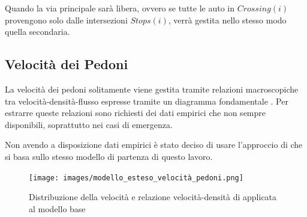 Quando la via principale sarà libera, ovvero se tutte le auto in $\textit{Crossing}(i)$ provengono solo dalle intersezioni $\textit{Stops}(i)$, verrà gestita nello stesso modo quella secondaria.

\subsection{Velocità dei Pedoni}
La velocità dei pedoni solitamente viene gestita tramite relazioni macroscopiche tra velocità-densità-flusso
espresse tramite un diagramma fondamentale \parencite{nikolic2016probabilistic}.
Per estrarre queste relazioni sono richiesti dei dati empirici che non sempre disponibili, soprattutto nei casi di emergenza.

Non avendo a disposizione dati empirici è stato deciso di usare l'approccio di \textcite{wang2021novel}
che si basa sullo stesso modello di partenza di questo lavoro.

\begin{figure}[ht]
    \centering
    \texttt{[image: images/modello\_esteso\_velocità\_pedoni.png]}
    \label{fig:modello-esteso-velocita-pedoni}
    \caption{Distribuzione della velocità e relazione velocità-densità di \textcite{wang2021novel} applicata al modello base}
\end{figure}
